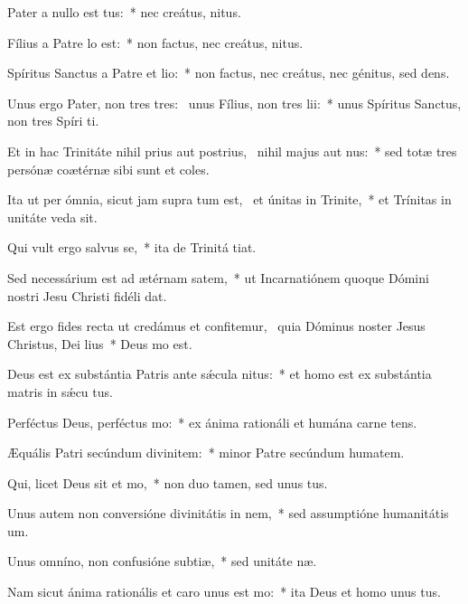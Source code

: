 \item Pater a nullo est tus:~* nec creátus,  nitus.
\item Fílius a Patre lo est:~* non factus, nec creátus,  nitus.
\item Spíritus Sanctus a Patre et lio:~* non factus, nec creátus, nec génitus, sed dens.
\item Unus ergo Pater, non tres tres:~\pscross{} unus Fílius, non tres lii:~* unus Spíritus Sanctus, non tres Spíri ti.
\item Et in hac Trinitáte nihil prius aut postrius,~\pscross{} nihil majus aut nus:~* sed totæ tres persónæ coætérnæ sibi sunt et coles.
\item Ita ut per ómnia, sicut jam supra tum est,~\pscross{} et únitas in Trinite,~* et Trínitas in unitáte veda sit.
\item Qui vult ergo salvus se,~* ita de Trinitá tiat.
\item Sed necessárium est ad ætérnam satem,~* ut Incarnatiónem quoque Dómini nostri Jesu Christi fidéli dat.
\item Est ergo fides recta ut credámus et confitemur,~\pscross{} quia Dóminus noster Jesus Christus, Dei lius~* Deus  mo est.
\item Deus est ex substántia Patris ante sǽcula nitus:~* et homo est ex substántia matris in sǽcu tus.
\item Perféctus Deus, perféctus mo:~* ex ánima rationáli et humána carne tens.
\item Æquális Patri secúndum divinitem:~* minor Patre secúndum humatem.
\item Qui, licet Deus sit et mo,~* non duo tamen, sed unus  tus.
\item Unus autem non conversióne divinitátis in nem,~* sed assumptióne humanitátis  um.
\item Unus omníno, non confusióne subtiæ,~* sed unitáte næ.
\item Nam sicut ánima rationális et caro unus est mo:~* ita Deus et homo unus  tus.
